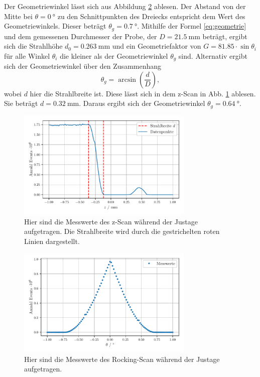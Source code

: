 Der Geometriewinkel lässt sich aus Abbildung \ref{abb:dreieck} ablesen. 
Der Abstand von der Mitte bei $\theta = \SI{0}{\degree}$ zu den Schnittpunkten des Dreiecks entspricht dem Wert des Geometriewinkels. 
Dieser beträgt $\theta_g = \SI{0.7}{\degree}$. 
Mithilfe der Formel \eqref{eq:geometrie} und dem gemessenen Durchmesser der Probe, der $D = \SI{21.5}{\milli\metre}$ beträgt, ergibt sich die Strahlhöhe $d_0 = \SI{0.263}{\milli\meter}$ und ein Geometriefaktor von $G = \num{81.85} \cdot \sin \theta_i$ für alle Winkel $\theta_i$ die kleiner als der Geometriewinkel $\theta_g$ sind.
Alternativ ergibt sich der Geometriewinkel über den Zusammenhang 
\begin{equation*}
    \theta_g = \arcsin\left( \frac{d}{D} \right),
\end{equation*}
wobei $d$ hier die Strahlbreite ist. Diese lässt sich in dem z-Scan in Abb. \ref{fig:z_scan} ablesen. Sie beträgt $d = \SI{0.32}{\milli\meter}$.
Daraus ergibt sich der Geometriewinkel $\theta_g = \SI{0.64}{\degree}$.

\begin{figure}
    \centering
    \includegraphics[width=0.75\textwidth]{figures/z_scan.pdf}
    \caption{Hier sind die Messwerte des z-Scan während der Justage aufgetragen. Die Strahlbreite wird durch die gestrichelten roten Linien dargestellt.}
    \label{fig:z_scan}
\end{figure}

\begin{figure}
    \centering
    \includegraphics[width=0.75\textwidth]{figures/dreieck.pdf}
    \caption{Hier sind die Messwerte des Rocking-Scan während der Justage aufgetragen.}
    \label{abb:dreieck}
\end{figure}

